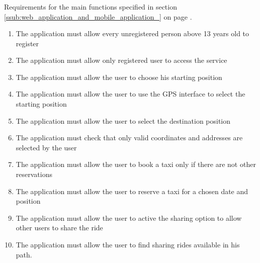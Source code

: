 \subsubsection{}
Requirements for the main functions specified in section \ref{ssub:web_application_and_mobile_application_} on page \pageref{ssub:web_application_and_mobile_application_}.
\begin{enumerate}[resume*]
	\item The application must allow every unregistered person above 13 years old to register
	\item The application must allow only registered user to access the service
	\item The application must allow the user to choose his starting position
	\item The application must allow the user to use the GPS interface to select the starting position
	\item The application must allow the user to select the destination position
	\item The application must check that only valid coordinates and addresses  are selected by the user
	\item The application must allow the user to book a taxi only if there are not other reservations
	\item The application must allow the user to reserve a taxi for a chosen  date and position
	\item The application must allow the user to active the sharing option to allow other users to share the ride
	\item The application must allow the user to find sharing rides available in his path. 
\end{enumerate}

